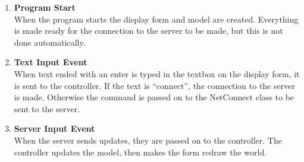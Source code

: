 \documentclass{article}
\begin{document}
		\begin{enumerate}
			\item
				\textbf{Program Start}\\
				When the program starts the display form and model are created. Everything is made ready for the connection to the server to be made, but this is not done automatically.
			\item
				\textbf{Text Input Event}\\
				When text ended with an enter is typed in the textbox on the display form, it is sent to the controller. If the text is ``connect'', the connection to the server is made. Otherwise the command is passed on to
				the NetConnect class to be sent to the server.
			\item
				\textbf{Server Input Event}\\
				When the server sends updates, they are passed on to the controller. The controller updates the model, then makes the form redraw the world.
		\end{enumerate}
\end{document}
